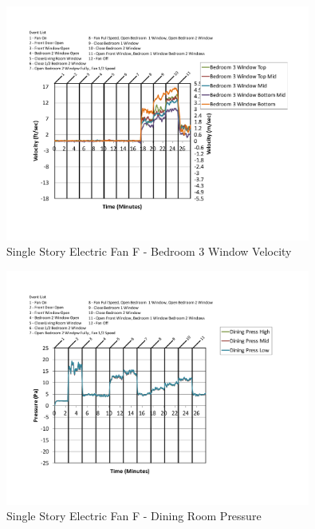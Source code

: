 \documentclass{article}
\begin{document}
\begin{appendices}
	\begin{figure}[H]
		\centering
		\includegraphics[height=3.05in,trim=0.67in 1.1in 0.67in 0.8in,clip=true]{0_Images/Results_Charts/ColdFlow/Single_Story/Electric/F/Bedroom_3_Window_Velocity.pdf}
		\caption{Single Story Electric Fan F - Bedroom 3 Window Velocity}
	\end{figure}
 

	\begin{figure}[H]
		\centering
		\includegraphics[height=3.05in,trim=0.67in 1.1in 0.67in 0.8in,clip=true]{0_Images/Results_Charts/ColdFlow/Single_Story/Electric/F/Dining_Room_Pressure.pdf}
		\caption{Single Story Electric Fan F - Dining Room Pressure}
	\end{figure}
 
	\clearpage


\end{appendices}
\end{document}

